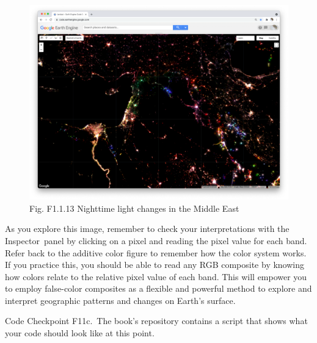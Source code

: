 \documentclass[
  letterpaper,
  DIV=11,
  numbers=noendperiod]{scrreprt}
\begin{document}
\begin{figure}

{\centering \includegraphics{./F1/image48.png}

}

\caption{Fig. F1.1.13 Nighttime light changes in the Middle East}

\end{figure}

As you explore this image, remember to check your interpretations with
the Inspector~panel by clicking on a pixel and reading the pixel value
for each band. Refer back to the additive color figure to remember how
the color system works. If you practice this, you should be able to read
any RGB composite by knowing how colors relate to the relative pixel
value of each band. This will empower you to employ false-color
composites as a flexible and powerful method to explore and interpret
geographic patterns and changes on Earth's surface.~

\begin{tcolorbox}[enhanced jigsaw, left=2mm, breakable, rightrule=.15mm, opacityback=0, colframe=quarto-callout-note-color-frame, colbacktitle=quarto-callout-note-color!10!white, arc=.35mm, opacitybacktitle=0.6, toptitle=1mm, colback=white, leftrule=.75mm, title=\textcolor{quarto-callout-note-color}{\faInfo}\hspace{0.5em}{Note}, toprule=.15mm, bottomtitle=1mm, titlerule=0mm, bottomrule=.15mm, coltitle=black]

Code Checkpoint F11c.~The book's repository contains a script that shows
what your code should look like at this point.

\end{tcolorbox}
\end{document}
